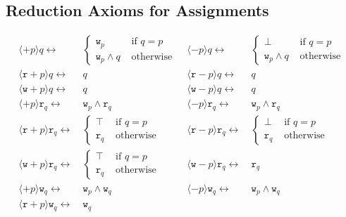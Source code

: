 \documentclass{llncs}
\newcommand{\readable}[1]{\mathtt{r}_{#1}}
\newcommand{\writable}[1]{\mathtt{w}_{#1}}
\newcommand{\assgntopR}[1]{{\mathtt r {+} #1}}
\newcommand{\assgnbotR}[1]{{\mathtt r {-} #1}}
\newcommand{\assgntopW}[1]{{\mathtt w {+} #1}}
\newcommand{\assgnbotW}[1]{{\mathtt w {-} #1}}
\newcommand{\assgntopV}[1]{{\mathtt {+} #1}}
\newcommand{\assgnbotV}[1]{{\mathtt {-} #1}}
\newcommand{\ldia}[1]{ \big\langle #1 \big\rangle}
\newcommand{\leqv}{ \leftrightarrow }
\begin{document}
\subsection{Reduction Axioms for Assignments}\label{sec:redax_atmpgm} 

\begin{table}[t]
\begin{align*}
\ldia{\assgntopV p } q \leqv &\ \begin{cases} 
					\writable{p} 	& \text{ if } q = p \\
					\writable{p} \land q & \text{ otherwise } 
					\end{cases} 
& \ldia{\assgnbotV p } q \leqv &\ \begin{cases} 
					\bot 	& \text{ if } q = p \\
					\writable{p} \land q & \text{ otherwise } 
					\end{cases} 
\\
\ldia{\assgntopR p } q \leqv &\ q
& \ldia{\assgnbotR p } q \leqv &\ q
\\
\ldia{\assgntopW p } q \leqv &\ q
& \ldia{\assgnbotW p } q \leqv &\ q
%
\\
\ldia{\assgntopV p} \readable q \leqv &\  \writable p \land \readable q
& \ldia{\assgnbotV p} \readable q \leqv &\  \writable p \land \readable q
\\
\ldia{\assgntopR p} \readable q \leqv &\ \begin{cases}
								\top & \text{ if } q = p \\
								\readable q & \text{ otherwise }
								\end{cases}
& \ldia{\assgnbotR p} \readable q \leqv &\ \begin{cases}
								\bot & \text{ if } q = p \\
								\readable q & \text{ otherwise }
								\end{cases}
\\
\ldia{\assgntopW p} \readable q \leqv &\ \begin{cases}
                \top & \text{ if } q = p \\
                \readable q & \text{ otherwise }
                \end{cases}
& \ldia{\assgnbotW p} \readable q \leqv &\ \readable q
%
\\
\ldia{\assgntopV p } \writable{q} \leqv &\ \writable{p} \land \writable{q}
& \ldia{\assgnbotV p } \writable{q} \leqv &\ \writable{p} \land \writable{q}
\\
\ldia{\assgntopR p } \writable{q} \leqv &\ \writable{q}

\end{align*}
\end{table}
\end{document}
